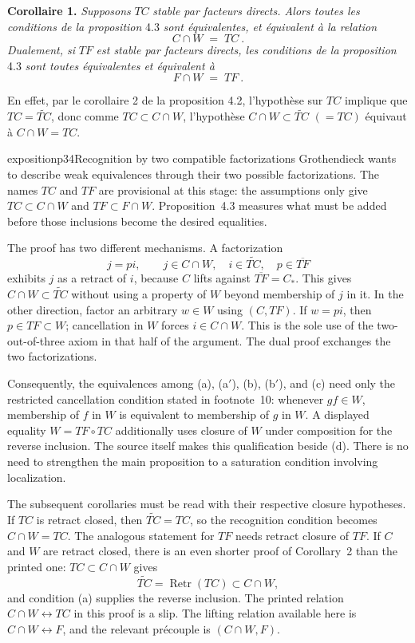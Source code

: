 \textbf{Corollaire 1.} \textit{Supposons} $TC$ \textit{stable par facteurs directs. Alors toutes les conditions de la proposition} 4.3 \textit{sont équivalentes, et équivalent à la relation}
\[
C\cap W \;=\; TC\ .
\tag*{(4.3.4)}
\]
\textit{Dualement, si} $TF$ \textit{est stable par facteurs directs, les conditions de la proposition} 4.3 \textit{sont toutes équivalentes et équivalent à}
\[
F\cap W \;=\; TF\ .
\tag*{(4.3.4$'$)}
\]


En effet, par le corollaire 2 de la proposition 4.2, l'hypothèse sur $TC$ implique que $TC = \widetilde{TC}$, donc comme $TC \subset C{\cap}W$, l'hypothèse $C{\cap}W \subset \widetilde{TC}$ $(= TC)$ équivaut à $C{\cap}W = TC$.

\begin{dcomment}{exposition}{p34}{Recognition by two compatible factorizations}
Grothendieck wants to describe weak equivalences through their two possible factorizations. The names $TC$ and $TF$ are provisional at this stage: the assumptions only give $TC\subset C\cap W$ and $TF\subset F\cap W$. Proposition~4.3 measures what must be added before those inclusions become the desired equalities.

The proof has two different mechanisms. A factorization
\[
j=pi,\qquad j\in C\cap W,\quad
i\in\widetilde{TC},\quad p\in\overline{TF}
\]
exhibits $j$ as a retract of $i$, because $C$ lifts against $\overline{TF}=C_*$. This gives $C\cap W\subset\widetilde{TC}$ without using a property of $W$ beyond membership of $j$ in it. In the other direction, factor an arbitrary $w\in W$ using $(C,TF)$. If $w=pi$, then $p\in TF\subset W$; cancellation in $W$ forces $i\in C\cap W$. This is the sole use of the two-out-of-three axiom in that half of the argument. The dual proof exchanges the two factorizations.

Consequently, the equivalences among (a), (a$'$), (b), (b$'$), and (c) need only the restricted cancellation condition stated in footnote~10: whenever $gf\in W$, membership of $f$ in $W$ is equivalent to membership of $g$ in $W$. A displayed equality $W=TF\circ TC$ additionally uses closure of $W$ under composition for the reverse inclusion. The source itself makes this qualification beside (d). There is no need to strengthen the main proposition to a saturation condition involving localization.

The subsequent corollaries must be read with their respective closure hypotheses. If $TC$ is retract closed, then $\widetilde{TC}=TC$, so the recognition condition becomes $C\cap W=TC$. The analogous statement for $TF$ needs retract closure of $TF$. If $C$ and $W$ are retract closed, there is an even shorter proof of Corollary~2 than the printed one: $TC\subset C\cap W$ gives
\[
\widetilde{TC}=\operatorname{Retr}(TC)\subset C\cap W,
\]
and condition (a) supplies the reverse inclusion. The printed relation $C\cap W\longleftrightarrow TC$ in this proof is a slip. The lifting relation available here is $C\cap W\longleftrightarrow F$, and the relevant pr\'ecouple is $(C\cap W,F)$.
\end{dcomment}


